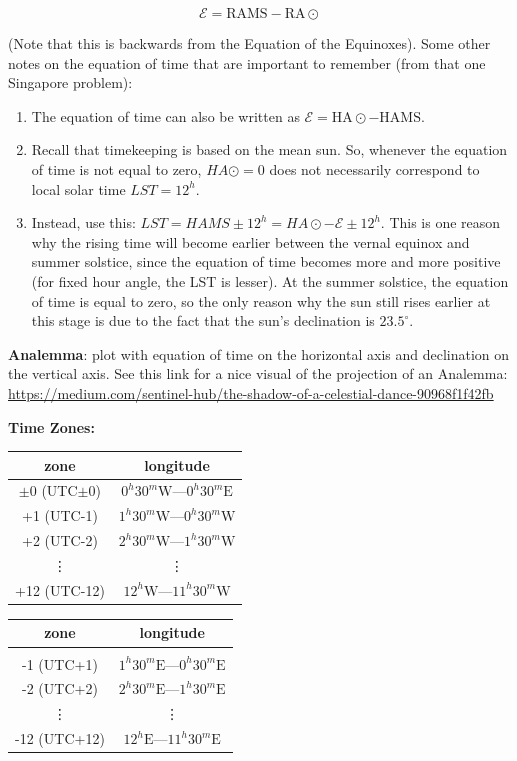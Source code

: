 \documentclass[12pt]{article}
\newcommand{\V}{

\vspace{\baselineskip}

}
\begin{document}
\[\mathcal{E} = \text{RAMS} - \text{RA}\odot\]

(Note that this is backwards from the Equation of the Equinoxes). Some other notes on the equation of time that are important to remember (from that one Singapore problem): 
\begin{enumerate}
    \item The equation of time can also be written as $\mathcal{E} = \text{HA}\odot - \text{HAMS}$. 
    \item Recall that timekeeping is based on the mean sun. So, whenever the equation of time is not equal to zero, $HA\odot = 0$ does not necessarily correspond to local solar time $LST = 12^{h}$.
    \item Instead, use this: $LST = HAMS \pm 12^{h} = HA\odot - \mathcal{E} \pm 12^{h}$. This is one reason why the rising time will become earlier between the vernal equinox and summer solstice, since the equation of time becomes more and more positive (for fixed hour angle, the LST is lesser). At the summer solstice, the equation of time is equal to zero, so the only reason why the sun still rises earlier at this stage is due to the fact that the sun's declination is $23.5^{\circ}$.
\end{enumerate}


\V




\textbf{Analemma}: plot with equation of time on the horizontal axis and declination on the vertical axis. See this link for a nice visual of the projection of an Analemma: \href{https://medium.com/sentinel-hub/the-shadow-of-a-celestial-dance-90968f1f42fb}{https://medium.com/sentinel-hub/the-shadow-of-a-celestial-dance-90968f1f42fb}\V

\textbf{Time Zones:} 

\begin{center}
\begin{tabular}{|c|c|}
\hline
zone & longitude \\
\hline\hline
$\pm 0$ (UTC$\pm$0) & $0^{h}30^{m}\text{W}$—$0^{h}30^{m}\text{E}$  \\
\hline
+1 (UTC-1) & $1^{h}30^{m}\text{W}$—$0^{h}30^{m}\text{W}$  \\
\hline
+2 (UTC-2) & $2^{h}30^{m}\text{W}$—$1^{h}30^{m}\text{W}$  \\
\hline
   \vdots  &\vdots  \\
\hline
+12 (UTC-12) & $12^{h}\text{W}$—$11^{h}30^{m}\text{W}$  \\
\hline
\end{tabular}
\begin{tabular}{|c|c|}
\hline
zone & longitude \\
\hline\hline
&  \\
\hline
-1 (UTC+1) & $1^{h}30^{m}\text{E}$—$0^{h}30^{m}\text{E}$  \\
\hline
-2 (UTC+2) & $2^{h}30^{m}\text{E}$—$1^{h}30^{m}\text{E}$  \\
\hline
   \vdots  &\vdots  \\
\hline
-12 (UTC+12) & $12^{h}\text{E}$—$11^{h}30^{m}\text{E}$  \\
\hline
\end{tabular}
\end{center}
\end{document}
